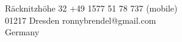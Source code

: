 \color{header-blue}

	\section*{\Huge \name}

	R\"acknitzh\"ohe 32 \hfill +49 1577 51 78 737 (mobile)\\
	01217 Dresden \hfill ronnybrendel@gmail.com\\
	Germany \hfill

\color{black}

\vspace{0.6cm}
